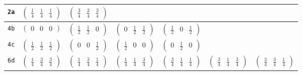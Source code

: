 \documentclass[fleqn,9pt,landscape]{jsarticle}
\begin{document}
\begin{center}
\begin{longtable}{ccccccc}
{\tt 2a} & $ \begin{pmatrix} \frac{1}{4} & \frac{1}{4} & \frac{1}{4} \end{pmatrix} $ & $ \begin{pmatrix} \frac{3}{4} & \frac{3}{4} & \frac{3}{4} \end{pmatrix} $ & $  $ & $  $ & $  $ & $  $ \\ \hline
{\tt 4b} & $ \begin{pmatrix} 0 & 0 & 0 \end{pmatrix} $ & $ \begin{pmatrix} \frac{1}{2} & \frac{1}{2} & 0 \end{pmatrix} $ & $ \begin{pmatrix} 0 & \frac{1}{2} & \frac{1}{2} \end{pmatrix} $ & $ \begin{pmatrix} \frac{1}{2} & 0 & \frac{1}{2} \end{pmatrix} $ & $  $ & $  $ \\ \hline
{\tt 4c} & $ \begin{pmatrix} \frac{1}{2} & \frac{1}{2} & \frac{1}{2} \end{pmatrix} $ & $ \begin{pmatrix} 0 & 0 & \frac{1}{2} \end{pmatrix} $ & $ \begin{pmatrix} \frac{1}{2} & 0 & 0 \end{pmatrix} $ & $ \begin{pmatrix} 0 & \frac{1}{2} & 0 \end{pmatrix} $ & $  $ & $  $ \\ \hline
{\tt 6d} & $ \begin{pmatrix} \frac{1}{4} & \frac{3}{4} & \frac{3}{4} \end{pmatrix} $ & $ \begin{pmatrix} \frac{1}{4} & \frac{3}{4} & \frac{1}{4} \end{pmatrix} $ & $ \begin{pmatrix} \frac{1}{4} & \frac{1}{4} & \frac{3}{4} \end{pmatrix} $ & $ \begin{pmatrix} \frac{3}{4} & \frac{1}{4} & \frac{1}{4} \end{pmatrix} $ & $ \begin{pmatrix} \frac{3}{4} & \frac{1}{4} & \frac{3}{4} \end{pmatrix} $ & $ \begin{pmatrix} \frac{3}{4} & \frac{3}{4} & \frac{1}{4} \end{pmatrix} $ \\ \hline

\end{longtable}
\end{center}
\end{document}
